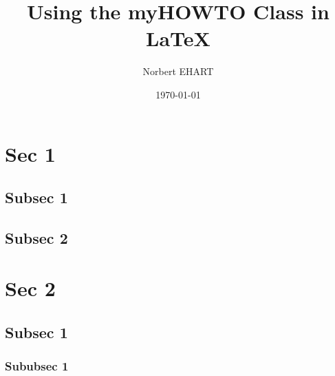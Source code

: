 \documentclass[]{myHOWTO-V1}
\title{Using the myHOWTO Class in \LaTeX}
\author{Norbert EHART}
\date{\today}
\begin{document}
	
\section{Sec 1}
\lipsum[9-10]

\subsection{Subsec 1}
\lipsum[4]

\subsection{Subsec 2}
\lipsum[5]

\section{Sec 2}
\lipsum[9-10]

\subsection{Subsec 1}
\lipsum[4]

\subsubsection{Sububsec 1}
\lipsum[5]
\end{document}
